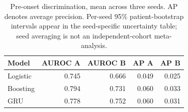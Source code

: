 \begin{table}[t]
\centering\small\setlength{\tabcolsep}{4pt}
\caption{Pre-onset discrimination, mean across three seeds. AP denotes average precision. Per-seed 95\% patient-bootstrap intervals appear in the seed-specific uncertainty table; seed averaging is not an independent-cohort meta-analysis.}

\begin{tabular}{lrrrr}\toprule
Model & AUROC A & AUROC B & AP A & AP B\\\midrule
Logistic & 0.745 & 0.666 & 0.049 & 0.025 \\
Boosting & 0.794 & 0.731 & 0.060 & 0.033 \\
GRU & 0.778 & 0.752 & 0.060 & 0.031 \\
\bottomrule\end{tabular}\end{table}
